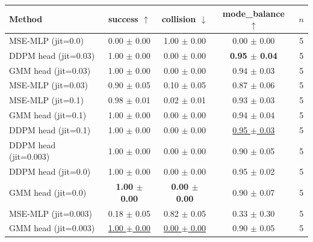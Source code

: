 \begin{tabular}{lcccc}
\toprule
Method & success $\uparrow$ & collision $\downarrow$ & mode\_balance $\uparrow$ & $n$ \\
\midrule
MSE-MLP (jit=0.0) & 0.00 $\pm$ 0.00 & 1.00 $\pm$ 0.00 & 0.00 $\pm$ 0.00 & 5 \\
DDPM head (jit=0.03) & 1.00 $\pm$ 0.00 & 0.00 $\pm$ 0.00 & \textbf{0.95 $\pm$ 0.04} & 5 \\
GMM head (jit=0.03) & 1.00 $\pm$ 0.00 & 0.00 $\pm$ 0.00 & 0.94 $\pm$ 0.03 & 5 \\
MSE-MLP (jit=0.03) & 0.90 $\pm$ 0.05 & 0.10 $\pm$ 0.05 & 0.87 $\pm$ 0.06 & 5 \\
MSE-MLP (jit=0.1) & 0.98 $\pm$ 0.01 & 0.02 $\pm$ 0.01 & 0.93 $\pm$ 0.03 & 5 \\
GMM head (jit=0.1) & 1.00 $\pm$ 0.00 & 0.00 $\pm$ 0.00 & 0.94 $\pm$ 0.04 & 5 \\
DDPM head (jit=0.1) & 1.00 $\pm$ 0.00 & 0.00 $\pm$ 0.00 & \underline{0.95 $\pm$ 0.03} & 5 \\
DDPM head (jit=0.003) & 1.00 $\pm$ 0.00 & 0.00 $\pm$ 0.00 & 0.90 $\pm$ 0.05 & 5 \\
DDPM head (jit=0.0) & 1.00 $\pm$ 0.00 & 0.00 $\pm$ 0.00 & 0.95 $\pm$ 0.02 & 5 \\
GMM head (jit=0.0) & \textbf{1.00 $\pm$ 0.00} & \textbf{0.00 $\pm$ 0.00} & 0.90 $\pm$ 0.07 & 5 \\
MSE-MLP (jit=0.003) & 0.18 $\pm$ 0.05 & 0.82 $\pm$ 0.05 & 0.33 $\pm$ 0.30 & 5 \\
GMM head (jit=0.003) & \underline{1.00 $\pm$ 0.00} & \underline{0.00 $\pm$ 0.00} & 0.90 $\pm$ 0.05 & 5 \\
\bottomrule
\end{tabular}
